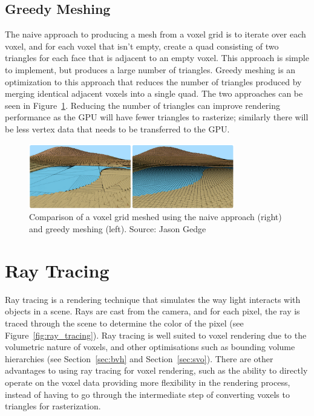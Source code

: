 \subsection{Greedy Meshing} \label{sec:greedy_meshing}
The naive approach to producing a mesh from a voxel grid is to iterate over each voxel, and for each voxel that isn't
empty, create a quad consisting of two triangles for each face that is adjacent to an empty voxel. This approach is simple
to implement, but produces a large number of triangles. Greedy meshing is an optimization to this approach that reduces
the number of triangles produced by merging identical adjacent voxels into a single quad. The two approaches can be seen
in Figure~\ref{fig:greedy_meshing}. Reducing the number of triangles can improve rendering performance as the GPU will have
fewer triangles to rasterize; similarly there will be less vertex data that needs to be transferred to the GPU.

\begin{figure}[thp]
    \begin{center}
        \includegraphics[width=0.8\textwidth]{figures/greedy_meshing.png}
    \end{center}
    \caption{Comparison of a voxel grid meshed using the naive approach (right) and greedy meshing (left).
        Source: Jason Gedge~\protect\cite{Gedge_2014}}
    \label{fig:greedy_meshing}
\end{figure}

\section{Ray Tracing}
Ray tracing is a rendering technique that simulates the way light interacts with objects in a scene. Rays are cast from the
camera, and for each pixel, the ray is traced through the scene to determine the color of the pixel (see Figure~\ref{fig:ray_tracing}).
Ray tracing is well suited to voxel rendering due to the volumetric nature of voxels, and other optimisations such as
bounding volume hierarchies (see Section~\ref{sec:bvh} and Section~\ref{sec:svo}). There are other advantages to using ray
tracing for voxel rendering, such as the ability to directly operate on the voxel data providing more flexibility in the
rendering process, instead of having to go through the intermediate step of converting voxels to triangles for rasterization.

